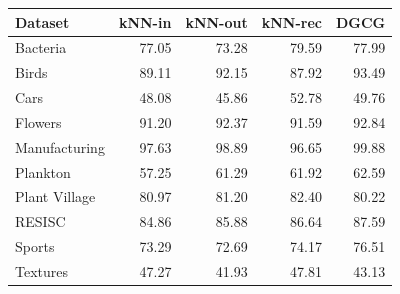 \begin{tabular}{lrrrr}
\hline
Dataset & kNN-in & kNN-out & kNN-rec & DGCG \\
\hline
Bacteria & 77.05 & 73.28 & 79.59 & 77.99 \\
Birds & 89.11 & 92.15 & 87.92 & 93.49 \\
Cars & 48.08 & 45.86 & 52.78 & 49.76 \\
Flowers & 91.20 & 92.37 & 91.59 & 92.84 \\
Manufacturing & 97.63 & 98.89 & 96.65 & 99.88 \\
Plankton & 57.25 & 61.29 & 61.92 & 62.59 \\
Plant Village & 80.97 & 81.20 & 82.40 & 80.22 \\
RESISC & 84.86 & 85.88 & 86.64 & 87.59 \\
Sports & 73.29 & 72.69 & 74.17 & 76.51 \\
Textures & 47.27 & 41.93 & 47.81 & 43.13 \\
\hline
\end{tabular}
